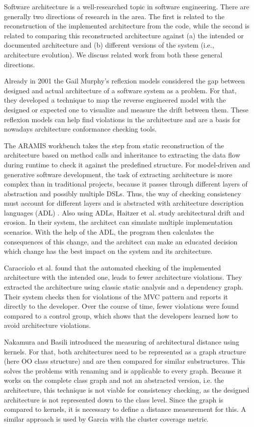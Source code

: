 \documentclass[sigplan, anonymous, review]{acmart}
\begin{document}
Software architecture is a well-researched topic in software engineering.
There are generally two directions of research in the area.
The first is related to the reconstruction of the implemented architecture from the code, while the second is related to comparing this reconstructed architecture against (a) the intended or documented architecture and (b) different versions of the system (i.e., architecture evolution).
We discuss related work from both these general directions.

Already in 2001 the Gail Murphy's reflexion models \cite{MurphyRefl} considered the gap between designed and actual architecture of a software system as a problem. For that, they developed a technique to map the reverse engineered model with the designed or expected one to visualize and measure the drift between them. These reflexion models can help find violations in the architecture and are a basis for nowadays architecture conformance checking tools. 

The ARAMIS workbench \cite{Aramis} takes the step from static reconstruction of the architecture based on method calls and inheritance to extracting the data flow during runtime to check it against the predefined structure. 
For model-driven and generative software development, the task of extracting architecture is more complex than in traditional projects, because it passes through different layers of abstraction and possibly multiple DSLs. 
Thus, the way of checking consistency must account for different layers and is abstracted with architecture description languages (ADL) \cite{ArcCons,Arc-MDSE}. 
Also using ADLs, Haitzer et al. \cite{Arc-Decision} study architectural drift and erosion. In their system, the architect can simulate multiple implementation scenarios. With the help of the ADL, the program then calculates the consequences of this change, and the architect can make an educated decision which change has the best impact on the system and its architecture. 

Caracciolo et al. \cite{ArcConf} found that the automated checking of the implemented architecture with the intended one, leads to fewer architecture violations. They extracted the architecture using classic static analysis and a dependency graph. Their system checks then for violations of the MVC pattern and reports it directly to the developer. Over the course of time, fewer violations were found compared to a control group, which shows that the developers learned how to avoid architecture violations.

Nakamura and Basili \cite{StructDist} introduced the measuring of architectural distance using kernels. For that, both architectures need to be represented as a graph structure (here OO class structure) and are then compared for similar substructures. This solves the problems with renaming and is applicable to every graph. 
Because it works on the complete class graph and not an abstracted version, i.e. the architecture, this technique is not viable for consistency checking, as the designed architecture is not represented down to the class level. 
Since the graph is compared to kernels, it is necessary to define a distance measurement for this. A similar approach is used by Garcia \cite{arcade-thesis} with the cluster coverage metric.
\end{document}
